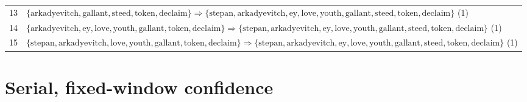 \begin{appendices}
\begin{longtable}{p{20pt}|p{\dimexpr\textwidth-\tabcolsep-20pt\relax}}
13 & $ \{ \text{arkadyevitch},\allowbreak\text{gallant},\allowbreak\text{steed},\allowbreak\text{token},\allowbreak\text{declaim} \} \Rightarrow \{ \text{stepan},\allowbreak\text{arkadyevitch},\allowbreak\text{ey},\allowbreak\text{love},\allowbreak\text{youth},\allowbreak\text{gallant},\allowbreak\text{steed},\allowbreak\text{token},\allowbreak\text{declaim} \} $ (1) \\
14 & $ \{ \text{arkadyevitch},\allowbreak\text{ey},\allowbreak\text{love},\allowbreak\text{youth},\allowbreak\text{gallant},\allowbreak\text{token},\allowbreak\text{declaim} \} \Rightarrow \{ \text{stepan},\allowbreak\text{arkadyevitch},\allowbreak\text{ey},\allowbreak\text{love},\allowbreak\text{youth},\allowbreak\text{gallant},\allowbreak\text{steed},\allowbreak\text{token},\allowbreak\text{declaim} \} $ (1) \\
15 & $ \{ \text{stepan},\allowbreak\text{arkadyevitch},\allowbreak\text{love},\allowbreak\text{youth},\allowbreak\text{gallant},\allowbreak\text{token},\allowbreak\text{declaim} \} \Rightarrow \{ \text{stepan},\allowbreak\text{arkadyevitch},\allowbreak\text{ey},\allowbreak\text{love},\allowbreak\text{youth},\allowbreak\text{gallant},\allowbreak\text{steed},\allowbreak\text{token},\allowbreak\text{declaim} \} $ (1) \\
\end{longtable}

\section{Serial, fixed-window confidence}
\label{appendix:rules-ser-fwi}


\end{appendices}
